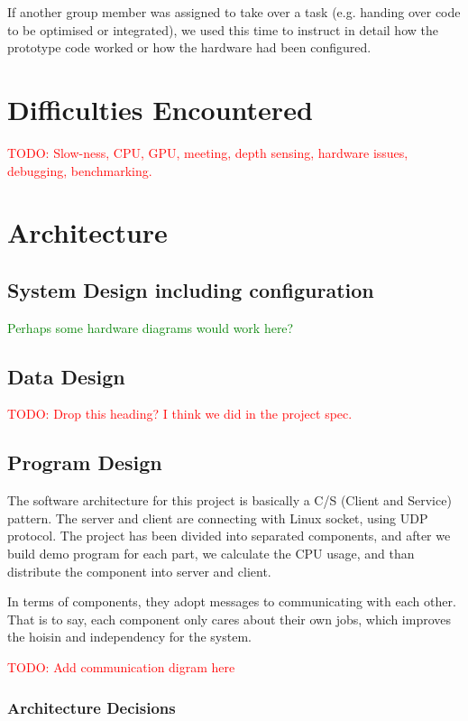 \documentclass[11pt,a4paper,titlepage]{report}
\begin{document}
If another group member was assigned to take over a task (e.g. handing over code to be optimised or integrated), we used this time to instruct in detail how the prototype code worked or how the hardware had been configured. 

\section{Difficulties Encountered}

\textcolor{red}{TODO: Slow-ness, CPU, GPU, meeting, depth sensing, hardware issues, debugging, benchmarking.}


\section{Architecture}
\subsection{System Design including configuration}

\textcolor{green}{Perhaps some hardware diagrams would work here?}

\subsection{Data Design}

\textcolor{red}{TODO: Drop this heading? I think we did in the project spec.}

\subsection{Program Design}


The software architecture for this project is basically a C/S (Client and Service) pattern. The server and client are connecting with Linux socket, using UDP protocol. The project has been divided into separated components, and after we build demo program for each part, we calculate the CPU usage, and than distribute the component into server and client.

In terms of components, they adopt messages to communicating with each other. That is to say, each component only cares about their own jobs, which improves the hoisin and independency for the system.

\textcolor{red}{TODO: Add communication digram here}


\subsubsection{Architecture Decisions}
\end{document}
